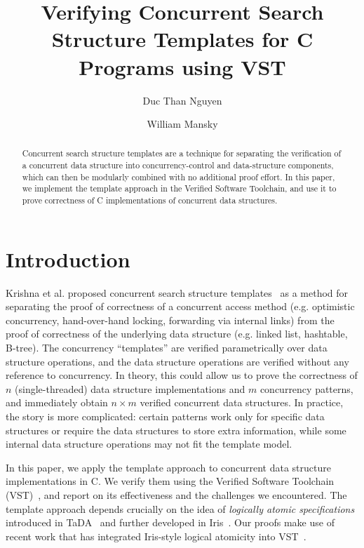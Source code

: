 \documentclass[a4paper,UKenglish,cleveref, autoref, thm-restate]{lipics-v2021}
\title{Verifying Concurrent Search Structure Templates for C Programs using VST} %
\author{Duc Than Nguyen}{University of Illinois at Chicago, USA \and \url{http://www.myhomepage.edu} }{johnqpublic@dummyuni.org}{https://orcid.org/0000-0002-1825-0097}{(Optional) author-specific funding acknowledgements}%
\author{William Mansky}{University of Illinois at Chicago, USA}{joanrpublic@dummycollege.org}{[orcid]}{[funding]}
\begin{document}
\maketitle

\begin{abstract}
Concurrent search structure templates are a technique for separating the verification of a concurrent data structure into concurrency-control and data-structure components, which can then be modularly combined with no additional proof effort. In this paper, we implement the template approach in the Verified Software Toolchain, and use it to prove correctness of C implementations of concurrent data structures. %
\end{abstract}

\section{Introduction}
\label{sec:introduction}
Krishna et al. proposed concurrent search structure templates~\cite{templates} as a method for separating the proof of correctness of a concurrent access method (e.g. optimistic concurrency, hand-over-hand locking, forwarding via internal links) from the proof of correctness of the underlying data structure (e.g. linked list, hashtable, B-tree). The concurrency ``templates'' are verified parametrically over data structure operations, and the data structure operations are verified without any reference to concurrency. In theory, this could allow us to prove the correctness of $n$ (single-threaded) data structure implementations and $m$ concurrency patterns, and immediately obtain $n \times m$ verified concurrent data structures. In practice, the story is more complicated: certain patterns work only for specific data structures or require the data structures to store extra information, while some internal data structure operations may not fit the template model. 

In this paper, we apply the template approach to concurrent data structure implementations in C. We verify them using the Verified Software Toolchain (VST)~\cite{plfcc}, and report on its effectiveness and the challenges we encountered. The template approach depends crucially on the idea of \emph{logically atomic specifications} introduced in TaDA~\cite{tada} and further developed in Iris~\cite{iris}. Our proofs make use of recent work that has integrated Iris-style logical atomicity into VST~\cite{iris-vst-arxiv}.
\end{document}
